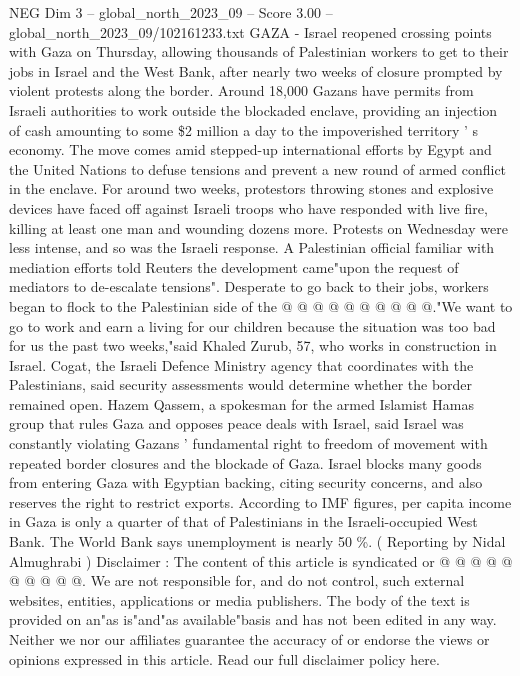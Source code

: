 \begin{textsample}{NEG Dim 3 – global\_north\_2023\_09 – Score 3.00 – global\_north\_2023\_09/102161233.txt}  \label{ex:f3_neg_414}
GAZA - Israel reopened crossing points with Gaza on Thursday, allowing thousands of Palestinian workers to get to their jobs in Israel and the West Bank, after nearly two weeks of closure prompted by violent protests along the border.
Around 18,000 Gazans have permits from Israeli authorities to work outside the blockaded enclave, providing an injection of cash amounting to some \$2 million a day to the impoverished territory ' s economy.
The move comes amid stepped-up international efforts by Egypt and the United Nations to defuse tensions and prevent a new round of armed conflict in the enclave.
For around two weeks, protestors throwing stones and explosive devices have faced off against Israeli troops who have responded with live fire, killing at least one man and wounding dozens more.
Protests on Wednesday were less intense, and so was the Israeli response.
A Palestinian official familiar with mediation efforts told Reuters the development came"upon the request of mediators to de-escalate tensions".
Desperate to go back to their jobs, workers began to flock to the Palestinian side of the @ @ @ @ @ @ @ @ @ @."We want to go to work and earn a living for our children because the situation was too bad for us the past two weeks,"said Khaled Zurub, 57, who works in construction in Israel.
Cogat, the Israeli Defence Ministry agency that coordinates with the Palestinians, said security assessments would determine whether the border remained open.
Hazem Qassem, a spokesman for the armed Islamist Hamas group that rules Gaza and opposes peace deals with Israel, said Israel was constantly violating Gazans ' fundamental right to freedom of movement with repeated border closures and the blockade of Gaza.
Israel blocks many goods from entering Gaza with Egyptian backing, citing security concerns, and also reserves the right to restrict exports.
According to IMF figures, per capita income in Gaza is only a quarter of that of Palestinians in the Israeli-occupied West Bank.
The World Bank says unemployment is nearly 50 \%. ( Reporting by Nidal Almughrabi ) Disclaimer : The content of this article is syndicated or @ @ @ @ @ @ @ @ @ @.
We are not responsible for, and do not control, such external websites, entities, applications or media publishers.
The body of the text is provided on an"as is"and"as available"basis and has not been edited in any way.
Neither we nor our affiliates guarantee the accuracy of or endorse the views or opinions expressed in this article.
Read our full disclaimer policy here.

\end{textsample}
